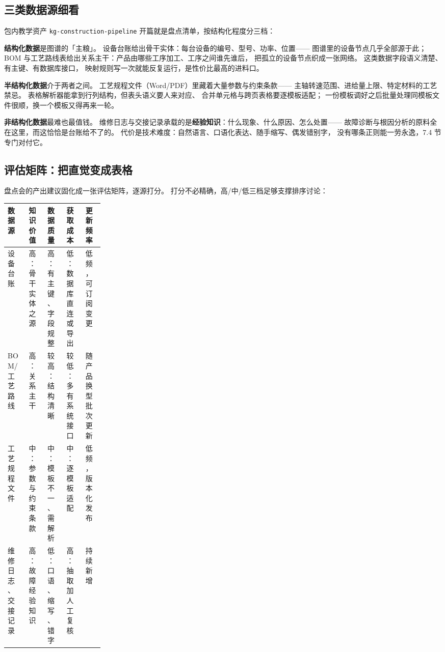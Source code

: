 \subsection{三类数据源细看}

包内教学资产 \texttt{kg-construction-pipeline} 开篇就是盘点清单，按结构化程度分三档：



\textbf{结构化数据}是图谱的「主粮」。
设备台账给出骨干实体：每台设备的编号、型号、功率、位置——
图谱里的设备节点几乎全部源于此；
BOM 与工艺路线表给出关系主干：产品由哪些工序加工、工序之间谁先谁后，
把孤立的设备节点织成一张网络。
这类数据字段语义清楚、有主键、有数据库接口，
映射规则写一次就能反复运行，是性价比最高的进料口。

\textbf{半结构化数据}介于两者之间。
工艺规程文件（Word/PDF）里藏着大量参数与约束条款——
主轴转速范围、进给量上限、特定材料的工艺禁忌。
表格解析器能拿到行列结构，但表头语义要人来对应、
合并单元格与跨页表格要逐模板适配；
一份模板调好之后批量处理同模板文件很顺，换一个模板又得再来一轮。

\textbf{非结构化数据}最难也最值钱。
维修日志与交接记录承载的是\textbf{经验知识}：什么现象、什么原因、怎么处置——
故障诊断与根因分析的原料全在这里，而这恰恰是台账给不了的。
代价是技术难度：自然语言、口语化表达、随手缩写、偶发错别字，
没有哪条正则能一劳永逸，7.4 节专门对付它。

\subsection{评估矩阵：把直觉变成表格}

盘点会的产出建议固化成一张评估矩阵，逐源打分。
打分不必精确，高/中/低三档足够支撑排序讨论：

\begin{center}
\begin{tabularx}{\linewidth}{@{}p{0.22\linewidth}XXXX@{}}
\toprule
\textbf{数据源} & \textbf{知识价值} & \textbf{数据质量} & \textbf{获取成本} & \textbf{更新频率} \\
\midrule
设备台账 & 高：骨干实体之源 & 高：有主键、字段规整 & 低：数据库直连或导出 & 低频，可订阅变更 \\
BOM/工艺路线 & 高：关系主干 & 较高：结构清晰 & 较低：多有系统接口 & 随产品换型批次更新 \\
工艺规程文件 & 中：参数与约束条款 & 中：模板不一、需解析 & 中：逐模板适配 & 低频，版本化发布 \\
维修日志、交接记录 & 高：故障经验知识 & 低：口语、缩写、错字 & 高：抽取加人工复核 & 持续新增 \\
\bottomrule
\end{tabularx}
\end{center}

